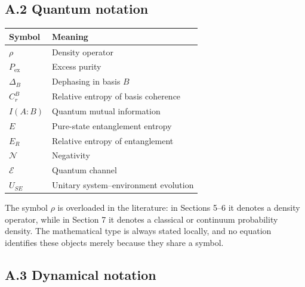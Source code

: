 \documentclass[
  11pt,
]{article}
\begin{document}
\subsection{A.2 Quantum notation}\label{a.2-quantum-notation}

\begin{longtable}[]{@{}ll@{}}
\toprule\noalign{}
Symbol & Meaning \\
\midrule\noalign{}
\endhead
\bottomrule\noalign{}
\endlastfoot
\(\rho\) & Density operator \\
\(P_{\mathrm{ex}}\) & Excess purity \\
\(\Delta_B\) & Dephasing in basis \(B\) \\
\(C_r^B\) & Relative entropy of basis coherence \\
\(I(A:B)\) & Quantum mutual information \\
\(E\) & Pure-state entanglement entropy \\
\(E_R\) & Relative entropy of entanglement \\
\(\mathcal N\) & Negativity \\
\(\mathcal E\) & Quantum channel \\
\(U_{SE}\) & Unitary system--environment evolution \\
\end{longtable}

The symbol \(\rho\) is overloaded in the literature: in Sections 5--6 it
denotes a density operator, while in Section 7 it denotes a classical or
continuum probability density. The mathematical type is always stated
locally, and no equation identifies these objects merely because they
share a symbol.

\subsection{A.3 Dynamical notation}\label{a.3-dynamical-notation}
\end{document}
